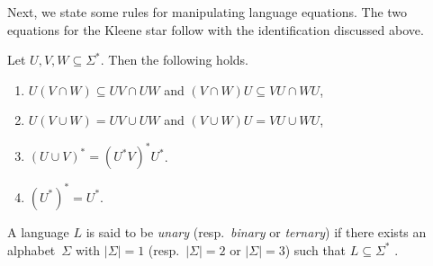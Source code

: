 Next, we state some rules for manipulating language equations. 
The two equations for the Kleene star follow with the identification discussed above.

\begin{proposition}\label{prelim:langeqn}
	Let $U, V, W \subseteq \Sigma^*$. Then the following holds.
	\begin{enumerate}
		\item \label{prelim:langeqn:concatcap} $U(V \cap W) \subseteq UV \cap UW$ and $(V\cap W)U \subseteq VU \cap WU$,
		
		\item  \label{prelim:langeqn:concatcup} $U(V \cup W) = UV \cup UW$ and $(V \cup W)U = VU \cup WU$, 
				
		\item \label{prelim:langeqn:starcup} $(U \cup V)^* = (U^*V)^*U^*$.
		
		\item \label{prelim:langeqn:Kleenestar-idemp} $(U^*)^* = U^*$.
	\end{enumerate}	
\end{proposition} 

A language $L$ 
is said to be \emph{unary} (resp.~\emph{binary} or \emph{ternary})  
if there exists an alphabet~$\Sigma$ with $|\Sigma| = 1$ (resp.~$|\Sigma| = 2$ or $|\Sigma|=3$) such that $L \subseteq \Sigma^*$ .

